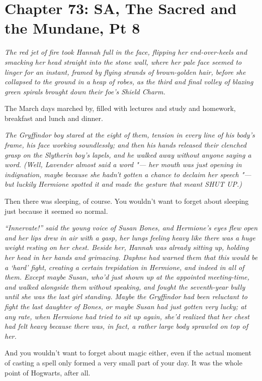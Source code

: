 \chapter{Chapter 73: SA, The Sacred and the Mundane, Pt 8}
\emph{The red jet of fire took Hannah full in the face, flipping her
end-over-heels and smacking her head straight into the stone wall, where
her pale face seemed to linger for an instant, framed by flying strands
of brown-golden hair, before she collapsed to the ground in a heap of
robes, as the third and final volley of blazing green spirals brought
down their foe's Shield Charm.}

The March days marched by, filled with lectures and study and homework,
breakfast and lunch and dinner.

\emph{The Gryffindor boy stared at the eight of them, tension in every
line of his body's frame, his face working soundlessly; and then his
hands released their clenched grasp on the Slytherin boy's lapels, and
he walked away without anyone saying a word. (Well, Lavender almost said
a word "--- her mouth was just opening in indignation, maybe because she
hadn't gotten a chance to declaim her speech "--- but luckily Hermione
spotted it and made the gesture that meant SHUT UP.)}

Then there was sleeping, of course. You wouldn't want to forget about
sleeping just because it seemed so normal.

\emph{``Innervate!'' said the young voice of Susan Bones, and Hermione's
eyes flew open and her lips drew in air with a gasp, her lungs feeling
heavy like there was a huge weight resting on her chest. Beside her,
Hannah was already sitting up, holding her head in her hands and
grimacing. Daphne had warned them that this would be a `hard' fight,
creating a certain trepidation in Hermione, and indeed in all of them.
Except maybe Susan, who'd just shown up at the appointed meeting-time,
and walked alongside them without speaking, and fought the seventh-year
bully until she was the last girl standing. Maybe the Gryffindor had
been reluctant to fight the last daughter of Bones, or maybe Susan had
just gotten very lucky; at any rate, when Hermione had tried to sit up
again, she'd realized that her chest had felt heavy because there was,
in fact, a rather large body sprawled on top of her.}

And you wouldn't want to forget about magic either, even if the actual
moment of casting a spell only formed a very small part of your day. It
was the whole point of Hogwarts, after all.

